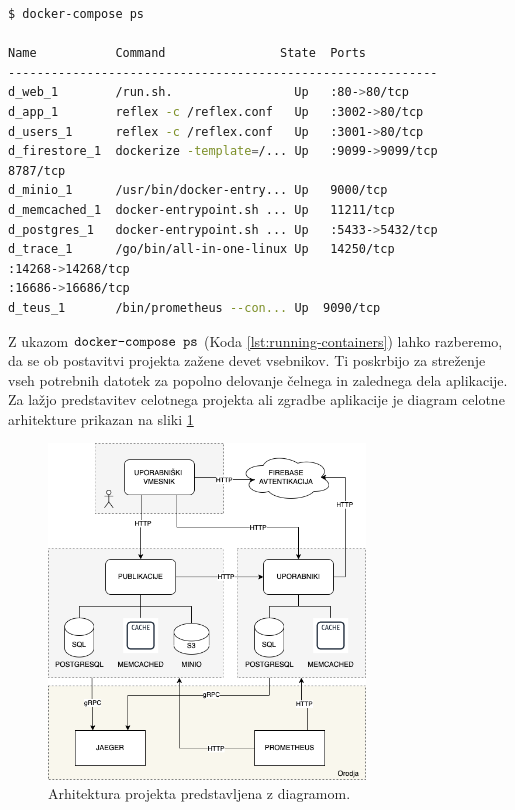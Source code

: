 \documentclass[a4paper, 12pt]{book}
\begin{document}
\begin{lstlisting}[language=bash,style=mystyle,caption={Prikaz zagnanih vsebnikov.},label=lst:running-containers]
$ docker-compose ps

Name           Command                State  Ports
------------------------------------------------------------
d_web_1        /run.sh.                 Up   :80->80/tcp
d_app_1        reflex -c /reflex.conf   Up   :3002->80/tcp
d_users_1      reflex -c /reflex.conf   Up   :3001->80/tcp
d_firestore_1  dockerize -template=/... Up   :9099->9099/tcp
8787/tcp
d_minio_1      /usr/bin/docker-entry... Up   9000/tcp
d_memcached_1  docker-entrypoint.sh ... Up   11211/tcp
d_postgres_1   docker-entrypoint.sh ... Up   :5433->5432/tcp
d_trace_1      /go/bin/all-in-one-linux Up   14250/tcp
:14268->14268/tcp
:16686->16686/tcp
d_teus_1       /bin/prometheus --con... Up  9090/tcp
\end{lstlisting}


Z ukazom $\verb=docker-compose ps=$ (Koda \ref{lst:running-containers}) lahko razberemo, da se ob postavitvi projekta zažene devet vsebnikov. Ti poskrbijo za streženje vseh potrebnih datotek za popolno delovanje čelnega in zalednega dela aplikacije. Za lažjo predstavitev celotnega projekta ali zgradbe aplikacije je diagram celotne arhitekture prikazan na sliki \ref{final-arch}

\begin{figure}[h]
\begin{center}
\includegraphics[width=0.75\textwidth]{slike/arch-done.png}
\end{center}
\caption{ Arhitektura projekta predstavljena z diagramom. }
\label{final-arch}
\end{figure}
\end{document}
